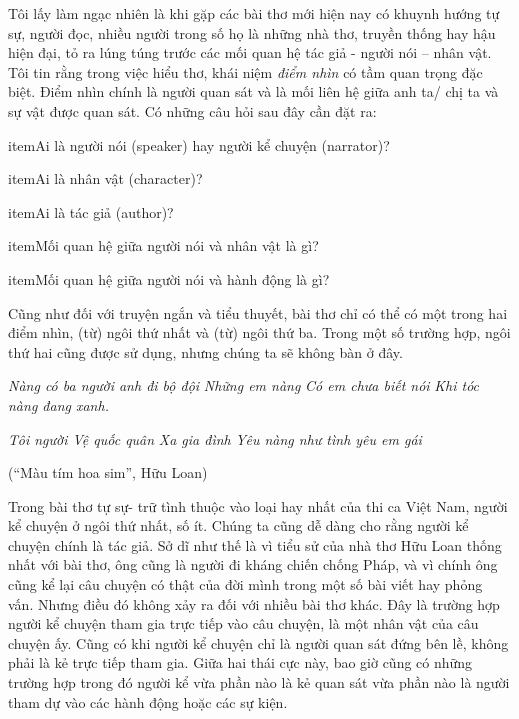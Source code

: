 \documentclass[../main.tex]{subfiles}
\begin{document}
\begin{multicols}{2}
Tôi lấy làm ngạc nhiên là khi gặp các bài thơ mới hiện nay có khuynh hướng tự sự, người đọc, nhiều người trong số họ là những nhà thơ, truyền thống hay hậu hiện đại, tỏ ra lúng túng trước các mối quan hệ tác giả - người nói – nhân vật. Tôi tin rằng trong việc hiểu thơ, khái niệm \textit{điểm nhìn} có tầm quan trọng đặc biệt. Điểm nhìn chính là người quan sát và là mối liên hệ giữa anh ta/ chị ta và sự vật được quan sát. Có những câu hỏi sau đây cần đặt ra:   
\begin{itemize}

item{Ai là người nói (speaker) hay người kể chuyện (narrator)?  }

item{Ai là nhân vật (character)?  }

item{Ai là tác giả (author)? }

item{Mối quan hệ giữa người nói và nhân vật là gì?  }

item{Mối quan hệ giữa người nói và hành động là gì? }

\end{itemize}
 Cũng như đối với truyện ngắn và tiểu thuyết, bài thơ chỉ có thể có một trong hai điểm nhìn, (từ) ngôi thứ nhất và (từ) ngôi thứ ba. Trong một số trường hợp, ngôi thứ hai cũng được sử dụng, nhưng chúng ta sẽ không bàn ở đây.  
\begin{blockquote}
        
\textit{Nàng có ba người anh đi bộ đội}        
\textit{Những em nàng}        
\textit{Có em chưa biết nói} 
\textit{Khi tóc nàng đang xanh.} 
        
\textit{Tôi người Vệ quốc quân}        
\textit{Xa gia đình} 
\textit{Yêu nàng như tình yêu em gái} 
        
(“Màu tím hoa sim”, Hữu Loan) 

\end{blockquote}
 
Trong bài thơ tự sự- trữ tình thuộc vào loại hay nhất của thi ca Việt Nam, người kể chuyện ở ngôi thứ nhất, số ít. Chúng ta cũng dễ dàng cho rằng người kể chuyện chính là tác giả. Sở dĩ như thế là vì tiểu sử của nhà thơ Hữu Loan thống nhất với bài thơ, ông cũng là người đi kháng chiến chống Pháp, và vì chính ông cũng kể lại câu chuyện có thật của đời mình trong một số bài viết hay phỏng vấn. Nhưng điều đó không xảy ra đối với nhiều bài thơ khác. Đây là trường hợp người kể chuyện tham gia trực tiếp vào câu chuyện, là một nhân vật của câu chuyện ấy. Cũng có khi người kể chuyện chỉ là người quan sát đứng bên lề, không phải là kẻ trực tiếp tham gia. Giữa hai thái cực này, bao giờ cũng có những trường hợp trong đó người kể vừa phần nào là kẻ quan sát vừa phần nào là người tham dự vào các hành động hoặc các sự kiện.  
\begin{blockquote}
        

\end{blockquote}
\end{multicols}
\end{document}
